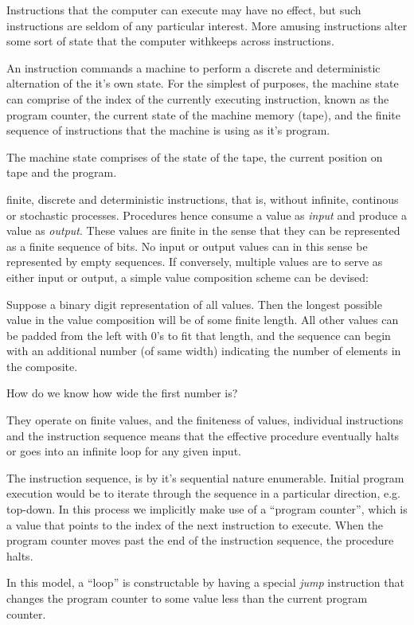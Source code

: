 Instructions that the computer can execute may have no effect, but such
instructions are seldom of any particular interest. More amusing instructions
alter some sort of state that the computer withkeeps across instructions.

An instruction
commands a machine to perform a discrete and deterministic alternation of the
it's own state. For the simplest of purposes, the machine state can comprise of
the index of the currently executing instruction, known as the program counter,
the current state of the machine memory (tape), and the finite sequence of
instructions that the machine is using as it's program.

The machine state comprises of the state of the tape, the current position on
tape and the program.

finite, discrete and deterministic instructions, that is,
without infinite, continous or stochastic processes. Procedures hence consume a
value as \emph{input} and produce a value as \emph{output}. These values are
finite in the sense that they can be represented as a finite sequence of bits.
No input or output values can in this sense be represented by empty sequences.
If conversely, multiple values are to serve as either input or output, a simple
value composition scheme can be devised:

Suppose a binary digit representation of all values. Then the longest possible
value in the value composition will be of some finite length. All other values
can be padded from the left with $0$'s to fit that length, and the sequence can
begin with an additional number (of same width) indicating the number of
elements in the composite.

How do we know how wide the first number is?

They operate on finite
values, and the finiteness of values, individual instructions and the
instruction sequence means that the effective procedure eventually halts or
goes into an infinite loop for any given input. 

The instruction sequence, is by it's sequential nature enumerable. Initial
program execution would be to iterate through the sequence in a particular
direction, e.g. top-down. In this process we implicitly make use of a ``program
counter'', which is a value that points to the index of the next instruction to
execute. When the program counter moves past the end of the instruction
sequence, the procedure halts.

In this model, a ``loop'' is constructable by having a special \emph{jump}
instruction that changes the program counter to some value less than the
current program counter.

